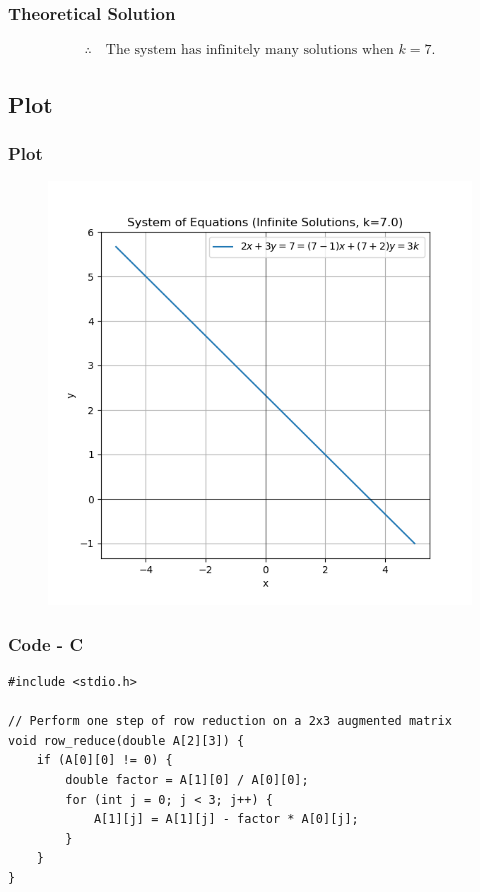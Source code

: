 \documentclass{beamer}
\theoremstyle{remark}
\numberwithin{equation}{section}
\begin{document}
\begin{frame}
\frametitle{Theoretical Solution}
\begin{align}
\therefore \quad \text{The system has infinitely many solutions when } 
\boxed{k=7}.
\end{align}


\end{frame}







\subsection{Plot}
\begin{frame}
    \frametitle{Plot}
\begin{figure}[H]
   \centering
   \includegraphics[width=0.7\columnwidth]{figs/infsols.png}
   \caption{}
   \label{}
   \end{figure}
\end{frame}

\begin{frame}[fragile]
    \frametitle{Code - C}
    \begin{lstlisting}
#include <stdio.h>

// Perform one step of row reduction on a 2x3 augmented matrix
void row_reduce(double A[2][3]) {
    if (A[0][0] != 0) {
        double factor = A[1][0] / A[0][0];
        for (int j = 0; j < 3; j++) {
            A[1][j] = A[1][j] - factor * A[0][j];
        }
    }
}

    \end{lstlisting}
    \end{frame}
\end{document}
